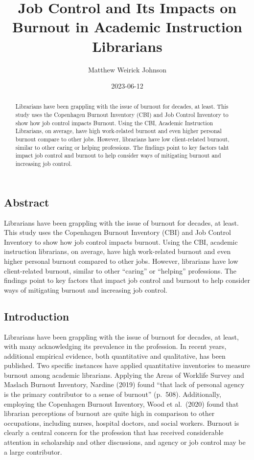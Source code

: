 \documentclass[
  twocolumn]{article}
\title{Job Control and Its Impacts on Burnout in Academic Instruction
Librarians}
\author{Matthew Weirick Johnson}
\date{2023-06-12}
\begin{document}
\maketitle
\begin{abstract}
Librarians have been grappling with the issue of burnout for decades, at
least. This study uses the Copenhagen Burnout Inventory (CBI) and Job
Control Inventory to show how job control impacts Burnout. Using the
CBI, Academic Instruction Librarians, on average, have high work-related
burnout and even higher personal burnout compare to other jobs. However,
librarians have low client-related burnout, similar to other caring or
helping professions. The findings point to key factors taht impact job
control and burnout to help consider ways of mitigating burnout and
increasing job control.
\end{abstract}

\subsection{Abstract}\label{abstract}

Librarians have been grappling with the issue of burnout for decades, at
least. This study uses the Copenhagen Burnout Inventory (CBI) and Job
Control Inventory to show how job control impacts burnout. Using the
CBI, academic instruction librarians, on average, have high work-related
burnout and even higher personal burnout compared to other jobs.
However, librarians have low client-related burnout, similar to other
``caring'' or ``helping'' professions. The findings point to key factors
that impact job control and burnout to help consider ways of mitigating
burnout and increasing job control.

\subsection{Introduction}\label{introduction}

Librarians have been grappling with the issue of burnout for decades, at
least, with many acknowledging its prevalence in the profession. In
recent years, additional empirical evidence, both quantitative and
qualitative, has been published. Two specific instances have applied
quantitative inventories to measure burnout among academic librarians.
Applying the Areas of Worklife Survey and Maslach Burnout Inventory,
Nardine (2019) found ``that lack of personal agency is the primary
contributor to a sense of burnout'' (p.~508). Additionally, employing
the Copenhagen Burnout Inventory, Wood et al.~(2020) found that
librarian perceptions of burnout are quite high in comparison to other
occupations, including nurses, hospital doctors, and social workers.
Burnout is clearly a central concern for the profession that has
received considerable attention in scholarship and other discussions,
and agency or job control may be a large contributor.
\end{document}
